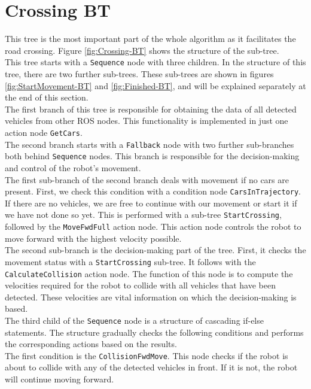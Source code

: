 \section{Crossing BT}
\label{sec:Crossing-BT}
    This tree is the most important part of the whole algorithm as it facilitates the road crossing. Figure \ref{fig:Crossing-BT} shows the structure of the sub-tree.\\
    This tree starts with a \texttt{Sequence} node with three children. In the structure of this tree, there are two further sub-trees. These sub-trees are shown in figures \ref{fig:StartMovement-BT} and \ref{fig:Finished-BT}, and will be explained separately at the end of this section.\\
    The first branch of this tree is responsible for obtaining the data of all detected vehicles from other ROS nodes. This functionality is implemented in just one action node \texttt{GetCars}.\\
    The second branch starts with a \texttt{Fallback} node with two further sub-branches both behind \texttt{Sequence} nodes. This branch is responsible for the decision-making and control of the robot's movement.\\
    The first sub-branch of the second branch deals with movement if no cars are present. First, we check this condition with a condition node \texttt{CarsInTrajectory}. If there are no vehicles, we are free to continue with our movement or start it if we have not done so yet. This is performed with a sub-tree \texttt{StartCrossing}, followed by the \texttt{MoveFwdFull} action node. This action node controls the robot to move forward with the highest velocity possible.\\
    The second sub-branch is the decision-making part of the tree. First, it checks the movement status with a \texttt{StartCrossing} sub-tree. It follows with the \texttt{CalculateCollision} action node. The function of this node is to compute the velocities required for the robot to collide with all vehicles that have been detected. These velocities are vital information on which the decision-making is based.\\
    The third child of the \texttt{Sequence} node is a structure of cascading if-else statements. The structure gradually checks the following conditions and performs the corresponding actions based on the results.\\
    The first condition is the \texttt{CollisionFwdMove}. This node checks if the robot is about to collide with any of the detected vehicles in front. If it is not, the robot will continue moving forward.\\
